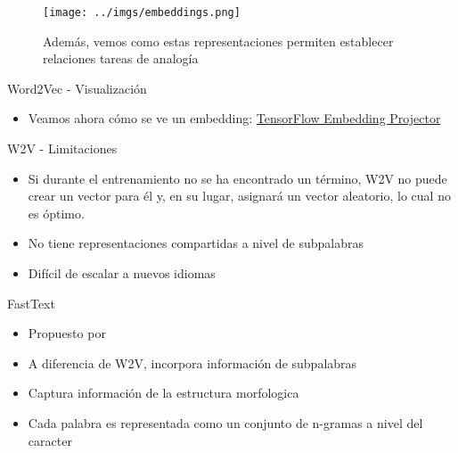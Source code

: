 \documentclass{beamer}
\begin{document}
\begin{frame}

\begin{figure}
    \centering
    \texttt{[image: ../imgs/embeddings.png]} %
    \caption{\tiny Además, vemos como estas representaciones permiten establecer relaciones  tareas de analogía }
    \label{miimagen}
\end{figure}
\end{frame}
\begin{frame}{Word2Vec - Visualización}
\begin{itemize}
\item Veamos ahora cómo se ve un embedding: \href{https://projector.tensorflow.org/}{TensorFlow Embedding Projector}
\end{itemize}
\end{frame}


\begin{frame}{W2V - Limitaciones}
\begin{itemize}
\item Si durante el entrenamiento no se ha encontrado un término, W2V no puede crear un vector para él y, en su lugar, asignará un vector aleatorio, lo cual no es óptimo. 
\item No tiene representaciones compartidas a nivel de subpalabras
\item Difícil de escalar a nuevos idiomas
\end{itemize}
\end{frame}

\begin{frame}{FastText}
\begin{itemize}
\item Propuesto por \cite{bojanowski2016enriching}

\item A diferencia de W2V, incorpora información de subpalabras
\item Captura información de la estructura morfologica 
\item Cada palabra es representada como un conjunto de n-gramas a nivel del caracter

\end{itemize}

\end{frame}
\end{document}
